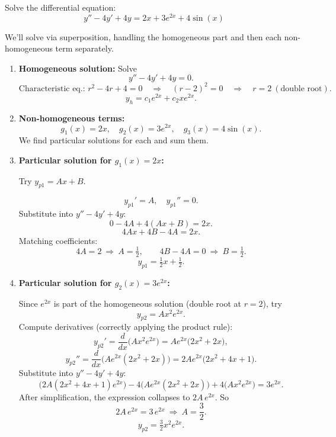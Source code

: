 \exampleline
\begin{example}
Solve the differential equation:
\[
y'' - 4y' + 4y = 2x + 3e^{2x} + 4\sin(x)
\]

\begin{solution}
We'll solve via superposition, handling the homogeneous part and then each non-homogeneous term separately.

\begin{enumerate}
\item \textbf{Homogeneous solution:} Solve
   \[
   y'' - 4y' + 4y = 0.
   \]
   \[
   \text{Characteristic eq.: } r^2 - 4r + 4 = 0 \quad \Longrightarrow \quad (r-2)^2 = 0 \quad \Longrightarrow \quad r = 2 \ (\text{double root}).
   \]
   \[
   y_h = c_1 e^{2x} + c_2 x e^{2x}.
   \]

\item \textbf{Non-homogeneous terms:}
   \[
   g_1(x) = 2x, 
   \quad
   g_2(x) = 3e^{2x},
   \quad
   g_3(x) = 4\sin(x).
   \]
   We find particular solutions for each and sum them.

\item \textbf{Particular solution for $g_1(x) = 2x$:}

   Try \(y_{p1} = Ax + B.\)

   \[
   y_{p1}' = A,\quad
   y_{p1}'' = 0.
   \]
   Substitute into \(y'' - 4y' + 4y\):
   \[
   0 - 4A + 4(Ax + B) = 2x.
   \]
   \[
   4Ax + 4B - 4A = 2x.
   \]
   Matching coefficients:
   \[
   4A = 2 \ \Longrightarrow\ A = \tfrac12,
   \qquad
   4B - 4A = 0 \ \Longrightarrow\ B = \tfrac12.
   \]
   \[
   y_{p1} = \tfrac12 x + \tfrac12.
   \]

\item \textbf{Particular solution for $g_2(x) = 3e^{2x}$:}

   Since \(e^{2x}\) is part of the homogeneous solution (double root at \(r=2\)), try
   \[
   y_{p2} = A x^2 e^{2x}.
   \]
   Compute derivatives (correctly applying the product rule):
   \[
   y_{p2}' = \frac{d}{dx}\bigl(Ax^2 e^{2x}\bigr)
           = A e^{2x}\bigl(2x^2 + 2x\bigr),
   \]
   \[
   y_{p2}'' = \frac{d}{dx}\bigl(A e^{2x}(2x^2 + 2x)\bigr)
            = 2A e^{2x}\bigl(2x^2 + 4x + 1\bigr).
   \]
   Substitute into \(y'' - 4y' + 4y\):
   \[
   \bigl(2A(2x^2 + 4x + 1)e^{2x}\bigr)
   - 4\bigl(A e^{2x}(2x^2 + 2x)\bigr)
   + 4\bigl(Ax^2 e^{2x}\bigr)
   = 3e^{2x}.
   \]
   After simplification, the expression collapses to \(2A\,e^{2x}\). So
   \[
   2A\,e^{2x} = 3\,e^{2x}
   \ \Longrightarrow\
   A = \frac{3}{2}.
   \]
   \[
   y_{p2} = \tfrac{3}{2} x^2 e^{2x}.
   \]


\end{enumerate}
\end{solution}
\end{example}
